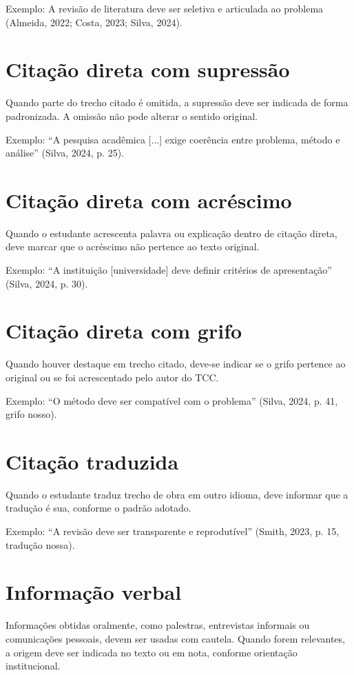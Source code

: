 Exemplo: A revisão de literatura deve ser seletiva e articulada ao problema (Almeida, 2022; Costa, 2023; Silva, 2024).

\section{Citação direta com supressão}

Quando parte do trecho citado é omitida, a supressão deve ser indicada de forma padronizada. A omissão não pode alterar o sentido original.

Exemplo: ``A pesquisa acadêmica [...] exige coerência entre problema, método e análise'' (Silva, 2024, p. 25).

\section{Citação direta com acréscimo}

Quando o estudante acrescenta palavra ou explicação dentro de citação direta, deve marcar que o acréscimo não pertence ao texto original.

Exemplo: ``A instituição [universidade] deve definir critérios de apresentação'' (Silva, 2024, p. 30).

\section{Citação direta com grifo}

Quando houver destaque em trecho citado, deve-se indicar se o grifo pertence ao original ou se foi acrescentado pelo autor do TCC.

Exemplo: ``O método deve ser compatível com o problema'' (Silva, 2024, p. 41, grifo nosso).

\section{Citação traduzida}

Quando o estudante traduz trecho de obra em outro idioma, deve informar que a tradução é sua, conforme o padrão adotado.

Exemplo: ``A revisão deve ser transparente e reprodutível'' (Smith, 2023, p. 15, tradução nossa).

\section{Informação verbal}

Informações obtidas oralmente, como palestras, entrevistas informais ou comunicações pessoais, devem ser usadas com cautela. Quando forem relevantes, a origem deve ser indicada no texto ou em nota, conforme orientação institucional.

